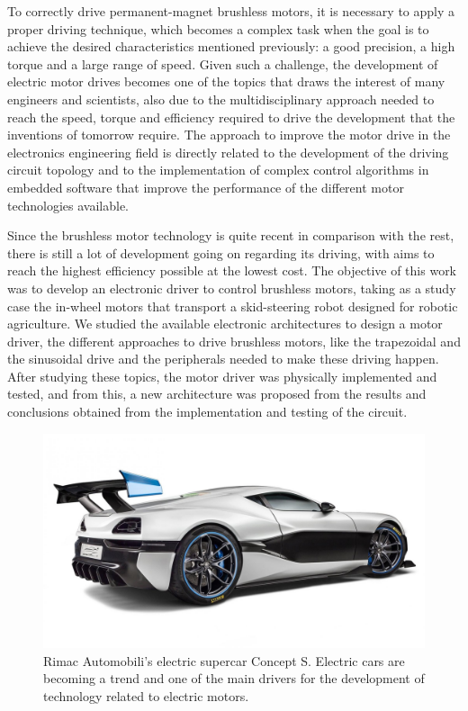 To correctly drive permanent-magnet brushless motors, it is necessary to apply a proper driving technique, which becomes a complex task when the goal is to achieve the desired characteristics mentioned previously: a good precision, a high torque and a large range of speed. Given such a challenge, the development of electric motor drives becomes one of the topics that draws the interest of many engineers and scientists, also due to the multidisciplinary approach needed to reach the speed, torque and efficiency required to drive the development that the inventions of tomorrow require. The approach to improve the motor drive in the electronics engineering field is directly related to the development of the driving circuit topology and to the implementation of complex control algorithms in embedded software that improve the performance of the different motor technologies available.

Since the brushless motor technology is quite recent in comparison with the rest, there is still a lot of development going on regarding its driving, with aims to reach the highest efficiency possible at the lowest cost. The objective of this work was to develop an electronic driver to control brushless motors, taking as a study case the in-wheel motors that transport a skid-steering robot designed for robotic agriculture. We studied the available electronic architectures to design a motor driver, the different approaches to drive brushless motors, like the trapezoidal and the sinusoidal drive and the peripherals needed to make these driving happen. After studying these topics, the motor driver was physically implemented and tested, and from this, a new architecture was proposed from the results and conclusions obtained from the implementation and testing of the circuit.

\begin{figure}[htbp]
\centering
\includegraphics[width=\columnwidth]{Images/rimac-concept_s4.png} 
\caption[Rimac Concept S]{Rimac Automobili's electric supercar Concept S. Electric cars are becoming a trend and one of the main drivers for the development of technology related to electric motors.}
\label{fig:rimac_concept_s}
\end{figure}

